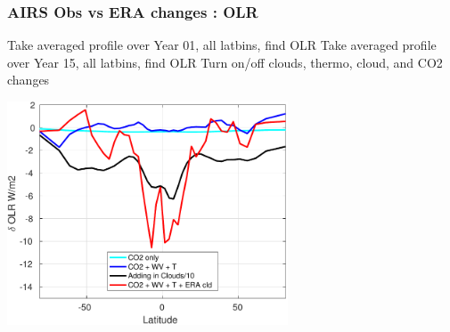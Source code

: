 \documentclass[10pt,t]{beamer}
\begin{document}
\begin{frame}
  \frametitle{AIRS Obs vs ERA changes : OLR}

  Take averaged profile over Year 01, all latbins, find OLR \newline
  Take averaged profile over Year 15, all latbins, find OLR \newline
  Turn on/off clouds, thermo, cloud, and CO2 changes
  
  \begin{center}
    \noindent\includegraphics[width=0.625\textwidth]{Figs/deltaolr_vs_lat.pdf}
  \end{center}
\end{frame}
\end{document}

